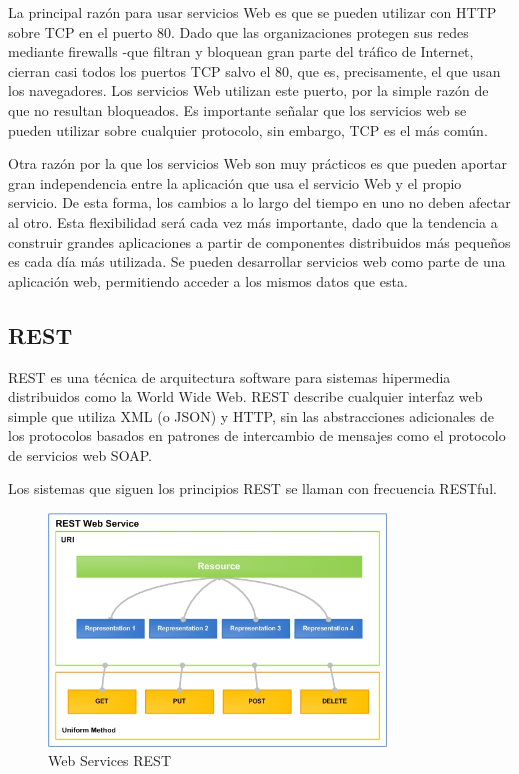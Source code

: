 La principal razón para usar servicios Web es que se pueden utilizar con HTTP sobre \gls{TCP} en el puerto 80. Dado que las organizaciones protegen sus redes mediante firewalls -que filtran y bloquean gran parte del tráfico de Internet, cierran casi todos los puertos TCP salvo el 80, que es, precisamente, el que usan los navegadores. Los servicios Web utilizan este puerto, por la simple razón de que no resultan bloqueados. Es importante señalar que los servicios web se pueden utilizar sobre cualquier protocolo, sin embargo, TCP es el más común.

Otra razón por la que los servicios Web son muy prácticos es que pueden aportar gran independencia entre la aplicación que usa el servicio Web y el propio servicio. De esta forma, los cambios a lo largo del tiempo en uno no deben afectar al otro. Esta flexibilidad será cada vez más importante, dado que la tendencia a construir grandes aplicaciones a partir de componentes distribuidos más pequeños es cada día más utilizada.
Se pueden desarrollar servicios web como parte de una aplicación web, permitiendo acceder a los mismos datos que esta.


\subsection{REST}



REST es una técnica de arquitectura software para sistemas hipermedia distribuidos como la World Wide Web.
REST describe cualquier interfaz web simple que utiliza \gls{XML} (o \gls{JSON}) y HTTP, sin las abstracciones adicionales de los protocolos basados en patrones de intercambio de mensajes como el protocolo de servicios web \gls{SOAP}. 

Los sistemas que siguen los principios REST se llaman con frecuencia RESTful.

\begin{figure}[htbp]
  \centering
    \includegraphics[width=0.8\textwidth]{imagenes/REST.jpg}
    
     \caption{Web Services REST}
    \label{fig:REST}
\end{figure}

